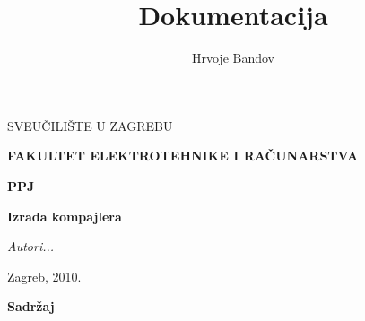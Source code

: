 \documentclass[a4paper,12pt,pdflatex]{article}
\title{Dokumentacija}
\author{Hrvoje Bandov}
\begin{document}
\thispagestyle{empty}

\vspace{1cm}
{\centering\mdseries\large
SVEUČILIŠTE U ZAGREBU
\par}

\vspace{0.5cm}
{\centering\bfseries\large
FAKULTET ELEKTROTEHNIKE I RAČUNARSTVA
\par}

\vspace{7.3cm}
{\centering\bfseries\large
PPJ
\par}

\vspace{1cm}
{\centering\bfseries\Large
Izrada kompajlera
\par}

\vspace{0.5cm}
{\centering\itshape
Autori...
\par}


\vspace{9.5cm}
{\centering\large
Zagreb, 2010.
\par}

\pagebreak
\bigskip
\bigskip
{\bfseries\large Sadržaj}
\bigskip
\setcounter{tocdepth}{3}
\renewcommand\contentsname{}
\tableofcontents

\pagebreak

\theoremstyle{definition}
	\newtheorem{example}{Primjer}
	\newtheorem{definition}{Definicija}
\theoremstyle{remark}
	\newtheorem*{solution}{Rješenje}




\end{document}
